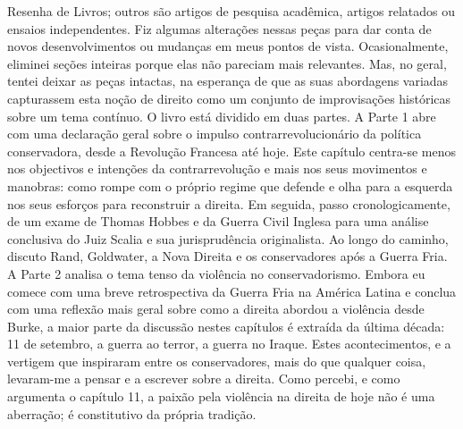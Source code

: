  \par 
Resenha de Livros; outros são artigos de pesquisa acadêmica, artigos relatados ou ensaios independentes. Fiz algumas alterações nessas peças para dar conta de novos desenvolvimentos ou mudanças em meus pontos de vista. Ocasionalmente, eliminei seções inteiras porque elas não pareciam mais relevantes. Mas, no geral, tentei deixar as peças intactas, na esperança de que as suas abordagens variadas capturassem esta noção de direito como um conjunto de improvisações históricas sobre um tema contínuo. O livro está dividido em duas partes. A Parte {\color{blue}1} abre com uma declaração geral sobre o impulso contrarrevolucionário da política conservadora, desde a Revolução Francesa até hoje. Este capítulo centra-se menos nos objectivos e intenções da contrarrevolução e mais nos seus movimentos e manobras: como rompe com o próprio regime que defende e olha para a esquerda nos seus esforços para reconstruir a direita. Em seguida, passo cronologicamente, de um exame de Thomas Hobbes e da Guerra Civil Inglesa para uma análise conclusiva do Juiz Scalia e sua jurisprudência originalista. Ao longo do caminho, discuto Rand, Goldwater, a Nova Direita e os conservadores após a Guerra Fria. A Parte {\color{blue}2} analisa o tema tenso da violência no conservadorismo. Embora eu comece com uma breve retrospectiva da Guerra Fria na América Latina e conclua com uma reflexão mais geral sobre como a direita abordou a violência desde Burke, a maior parte da discussão nestes capítulos é extraída da última década: {\color{blue}11} de setembro, a guerra ao terror, a guerra no Iraque. Estes acontecimentos, e a vertigem que inspiraram entre os conservadores, mais do que qualquer coisa, levaram-me a pensar e a escrever sobre a direita. Como percebi, e como argumenta o capítulo 11, a paixão pela violência na direita de hoje não é uma aberração; é constitutivo da própria tradição.